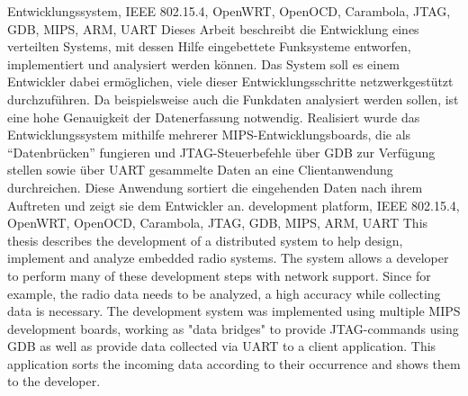 \documentclass[draft=false
              ,paper=a4
              ,twoside=false
              ,fontsize=11pt
              ,headsepline
              ,BCOR10mm
              ,DIV11
              ]{scrbook}
\begin{document}

\frontmatter
\maketitle

\begin{spacing}{1}
\HAWAbstractPage
{Entwicklungssystem, IEEE 802.15.4, OpenWRT, OpenOCD, Carambola, JTAG, GDB,
MIPS, ARM, UART}%
{Dieses Arbeit beschreibt die Entwicklung eines verteilten Systems, mit
dessen Hilfe eingebettete Funksysteme entworfen, implementiert und analysiert
werden können. Das System soll es einem Entwickler dabei ermöglichen,
viele dieser Entwicklungsschritte netzwerkgestützt durchzuführen. Da
beispielsweise auch die Funkdaten analysiert werden sollen, ist eine hohe
Genauigkeit der Datenerfassung notwendig. Realisiert wurde das
Entwicklungssystem mithilfe mehrerer MIPS-Entwicklungsboards, die als
"`Datenbrücken"' fungieren und JTAG-Steuerbefehle über GDB zur Verfügung
stellen sowie über UART gesammelte Daten an eine Clientanwendung durchreichen.
Diese Anwendung sortiert die eingehenden Daten nach ihrem Auftreten und zeigt
sie dem Entwickler an.\vspace{30pt}}
{development platform, IEEE 802.15.4, OpenWRT, OpenOCD, Carambola, JTAG, GDB,
MIPS, ARM, UART}%
{This thesis describes the development of a distributed system to help
design, implement and analyze embedded radio systems. The system
allows a developer to perform many of these development steps with network
support. Since for example, the radio data needs to be analyzed, a high
accuracy while collecting data is necessary. The development system was
implemented using multiple MIPS development boards, working as "data
bridges" to provide JTAG-commands using GDB as well as provide data
collected via UART to a client application. This application sorts the incoming
data according to their occurrence and shows them to the developer.}
\end{spacing}
\dominitoc
\newpage
\end{document}

